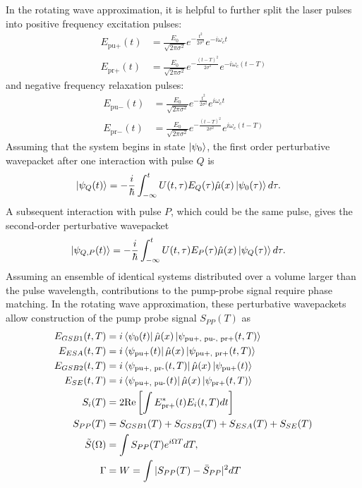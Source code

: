 In the rotating wave approximation, it is helpful to further split the laser pulses into positive frequency excitation pulses:
\begin{align}
	E_{\text{pu}+}(t) &= \frac{E_0}{\sqrt{2 \pi \sigma^2}} e^{-\frac{t^2}{2 \sigma^2} } e^{-i \omega_c t} \\
	E_{\text{pr}+}(t) &= \frac{E_0}{\sqrt{2 \pi \sigma^2}} e^{-\frac{\left(t-T\right)^2}{2 \sigma^2} }  e^{-i \omega_c \left(t-T\right)}
\end{align}
and negative frequency relaxation pulses:
\begin{align}
	E_{\text{pu}-}(t) &= \frac{E_0}{\sqrt{2 \pi \sigma^2}} e^{-\frac{t^2}{2 \sigma^2} } e^{i \omega_c t} \\
	E_{\text{pr}-}(t) &= \frac{E_0}{\sqrt{2 \pi \sigma^2}} e^{-\frac{\left(t-T\right)^2}{2 \sigma^2} }  e^{i \omega_c \left(t-T\right)}
\end{align}
Assuming that the system begins in state $\ket{\psi_0}$, the first order perturbative wavepacket after one interaction with pulse $Q$ is
\begin{align}
	\ket{\psi_{Q} (t)}  &= -\frac{i}{\hbar} \int_{-\infty}^{t} U(t, \tau) E_{Q}(\tau) \hat{\mu}(x) \ket{\psi_0 (\tau)} d \tau.
\end{align}
A subsequent interaction with pulse $P$, which could be the same pulse, gives the second-order perturbative wavepacket
\begin{align}
	\ket{\psi_{Q, P} (t)}  &= -\frac{i}{\hbar} \int_{-\infty}^{t} U(t, \tau) E_P (\tau) \hat{\mu}(x) \ket{\psi_Q (\tau)} d \tau.
\end{align}
Assuming an ensemble of identical systems distributed over a volume larger than the pulse wavelength, contributions to the pump-probe signal require phase matching. In the rotating wave approximation, these perturbative wavepackets allow construction of the pump probe signal $S_{PP}(T)$ as
\begin{align*}
	E_{GSB1} (t, T) &=  i \bra{\psi_{0} (t)} \hat{\mu} (x) \ket{\psi_{\text{pu+, pu-, pr+}} (t, T)}\\
	E_{ESA} (t, T) &=  i \bra{\psi_{\text{pu+}} (t)} \hat{\mu} (x) \ket{\psi_{\text{pu+, pr+}} (t, T)}\\
	E_{GSB2} (t, T) &=  i \bra{\psi_{\text{pu+, pr-}} (t, T)} \hat{\mu} (x) \ket{\psi_{\text{pu+}} (t)}\\
	E_{SE} (t, T) &=  i \bra{\psi_{\text{pu+, pu-}} (t)} \hat{\mu} (x) \ket{\psi_{\text{pr+}} (t, T)} \\
	S_{i} (T) &= 2 \text{Re} \left[ \int E^*_{\text{pr+}} (t) E_i (t, T) dt  \right] \\
	S_{PP} (T) &= S_{GSB1} (T) + S_{GSB2} (T) + S_{ESA} (T) + S_{SE} (T) \\
	\tilde{S}(\Omega) &= \int S_{PP} (T) e^{i \Omega T} d T,\\
	\Gamma &= W =\int |S_{PP}(T)-\bar{S}_{PP}|^2 dT
\end{align*}
